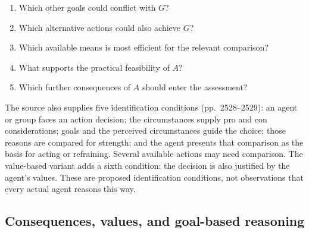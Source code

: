 \begin{enumerate}
\item Which other goals could conflict with \(G\)?
\item Which alternative actions could also achieve \(G\)?
\item Which available means is most efficient for the relevant comparison?
\item What supports the practical feasibility of \(A\)?
\item Which further consequences of \(A\) should enter the assessment?
\end{enumerate}

The source also supplies five identification conditions
(pp.~2528--2529): an agent or group faces an action decision;
the circumstances supply pro and con considerations; goals and the
perceived circumstances guide the choice; those reasons are compared
for strength; and the agent presents that comparison as the basis
for acting or refraining. Several available actions may need comparison.
The value-based variant adds a sixth condition: the decision is
also justified by the agent's values.
These are proposed identification conditions, not observations that
every actual agent reasons this way.

\subsection{Consequences, values, and goal-based reasoning}

